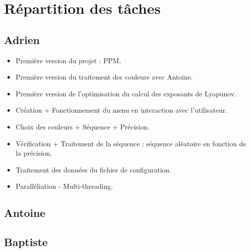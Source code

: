 \documentclass{article}
\begin{document}
	\section{Répartition des tâches}

	\subsection{Adrien}
\begin{itemize}
	\item Première version du projet : PPM.
	\item Première version du traitement des couleurs avec Antoine.
	\item Première version de l'optimisation du calcul des exposants de Lyapunov.
	\item Création + Fonctionnement du menu en interaction avec l'utilisateur.
	\item Choix des couleurs + Séquence + Précision.
	\item Vérification + Traitement de la séquence : séquence aléatoire en fonction de la précision.
	\item Traitement des données du fichier de configuration.
	\item Paralléliation - Multi-threading.
\end{itemize}

	\subsection{Antoine}

	\subsection{Baptiste}
\end{document}
